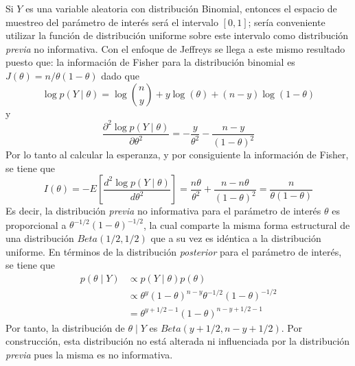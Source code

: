\begin{Eje}
Si $Y$ es una variable aleatoria con distribución Binomial, entonces el espacio de muestreo del parámetro de interés será el intervalo $[0,1]$; sería conveniente utilizar la función de distribución uniforme sobre este intervalo como distribución \emph{previa} no informativa. Con el enfoque de Jeffreys se llega a este mismo resultado puesto que: la información de Fisher para la distribución binomial es $J(\theta)=n/\theta(1- \theta)$ dado que
\begin{equation*}
\log p(Y \mid \theta)=\log \binom{n}{y} + y\log(\theta)+(n-y)\log(1-\theta)
\end{equation*}
y
\begin{equation*}
\frac{\partial^2 \log p(Y \mid \theta)}{\partial\theta^2}=-\frac{y}{\theta^2}-\frac{n-y}{(1-\theta)^2}
\end{equation*}
Por lo tanto al calcular la esperanza, y por consiguiente la información de Fisher, se tiene que
\begin{equation*}
I(\theta)=- E\left[\frac{d^2 \log p(Y \mid \theta)}{d\theta^2}\right]
=\frac{n\theta}{\theta^2}+\frac{n-n\theta}{(1-\theta)^2}= \frac{n}{\theta(1-\theta)}
\end{equation*}
Es decir, la distribución \emph{previa} no informativa para el parámetro de interés $\theta$ es proporcional a $\theta^{-1/2}(1-\theta)^{-1/2}$, la cual comparte la misma forma estructural de una distribución $Beta(1/2,1/2)$ que a su vez es idéntica a la distribución uniforme.  En términos de la distribución \emph{posterior} para el parámetro de interés, se tiene que
\begin{align*}
p(\theta \mid Y) &\propto p(Y \mid \theta) p(\theta)\\
&\propto \theta^{y}(1-\theta)^{n-y}\theta^{-1/2}(1-\theta)^{-1/2}\\
&=\theta^{y+1/2-1}(1-\theta)^{n-y+1/2-1}
\end{align*}
Por tanto, la distribución de $\theta \mid Y$ es $Beta(y+1/2,n-y+1/2)$. Por construcción, esta distribución no está alterada ni influenciada por la distribución \emph{previa} pues la misma es no informativa.
\end{Eje}


